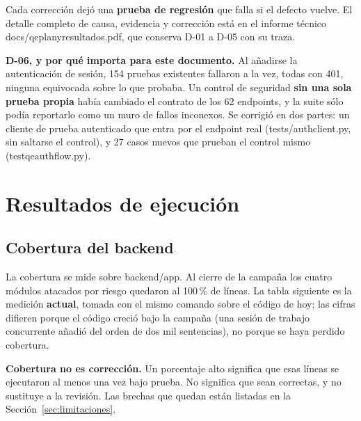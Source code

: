 \documentclass[11pt,a4paper]{article}
\newcommand{\code}[1]{{\ttfamily\small\def\_{\textunderscore\allowbreak}#1}}
\begin{document}
\noindent Cada corrección dejó una \textbf{prueba de regresión} que falla si el defecto vuelve.
El detalle completo de causa, evidencia y corrección está en el informe técnico
\code{docs/qe\_plan\_y\_resultados.pdf}, que conserva D-01 a D-05 con su traza.

\begin{finding}
\textbf{D-06, y por qué importa para este documento.} Al añadirse la autenticación de sesión,
154 pruebas existentes fallaron a la vez, todas con \code{401}, ninguna equivocada sobre lo que
probaba. Un control de seguridad \textbf{sin una sola prueba propia} había cambiado el contrato
de los 62 endpoints, y la suite sólo podía reportarlo como un muro de fallos inconexos. Se
corrigió en dos partes: un cliente de prueba autenticado que entra por el endpoint real
(\code{tests/auth\_client.py}, sin saltarse el control), y 27 casos nuevos que prueban el
control mismo (\code{test\_qe\_auth\_flow.py}).
\end{finding}

\section{Resultados de ejecución}
\label{sec:resultados}



\subsection*{Cobertura del backend}

La cobertura se mide sobre \code{backend/app}. Al cierre de la campaña los cuatro módulos
atacados por riesgo quedaron al 100\,\% de líneas. La tabla siguiente es la medición
\textbf{actual}, tomada con el mismo comando sobre el código de hoy; las cifras difieren porque
el código creció bajo la campaña (una sesión de trabajo concurrente añadió del orden de dos mil
sentencias), no porque se haya perdido cobertura.



\begin{finding}
\textbf{Cobertura no es corrección.} Un porcentaje alto significa que esas líneas se
ejecutaron al menos una vez bajo prueba. No significa que sean correctas, y no sustituye a la
revisión. Las brechas que quedan están listadas en la Sección~\ref{sec:limitaciones}.
\end{finding}
\end{document}
